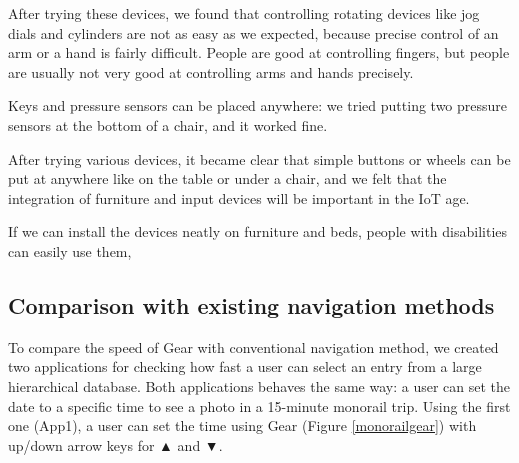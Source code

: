 \documentclass[conference]{IEEEtran}
\def\up{▲}
\def\down{▼}
\begin{document}
After trying these devices, we found that controlling rotating devices
like jog dials and cylinders are not as easy as we expected,
because precise control of an arm or a hand is fairly difficult.
People are good at controlling fingers, but people are usually not very good at
controlling arms and hands precisely.

Keys and pressure sensors can be placed anywhere:
we tried putting two pressure sensors at the bottom of a chair, and it worked fine.


After trying various devices, it became clear that simple buttons or
wheels can be put at anywhere like on the table or under a chair, and
we felt that the integration of furniture and input devices will be
important in the IoT age.

If we can install the devices neatly on furniture and beds, people with disabilities can easily use them, 

\subsection{Comparison with existing navigation methods}

To compare the speed of Gear with conventional navigation method,
we created two applications for checking how fast a user can select an entry
from a large hierarchical database.
%
Both applications behaves the same way:
a user can set the date to a specific time to see a photo in a 15-minute monorail trip.
%
Using the first one (App1), a user can set the time using Gear (Figure \ref{monorailgear})
with up/down arrow keys for {\up} and {\down}.
\end{document}
